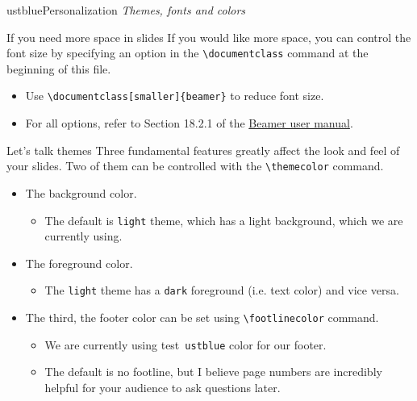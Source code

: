 \documentclass[]{beamer}
\newcommand{\hrefcol}[2]{\textcolor{uihteal}{\href{#1}{#2}}}
\newcommand{\testcolor}[1]{\colorbox{#1}{\textcolor{#1}{test}}~\texttt{#1}}
\begin{document}

\begin{chapter}{ustblue}{Personalization}
\textit{Themes, fonts and colors}
\end{chapter}


\begin{frame}[fragile]{If you need more space in slides}
If you would like more space, you can control the font size by specifying an option in the \verb|\documentclass| command at the beginning of this file.
\begin{itemize}
    \item Use \verb|\documentclass[smaller]{beamer}| to reduce font size.
    \item For all options, refer to Section 18.2.1 of the \hrefcol{https://www.ctan.org/tex-archive/macros/latex/contrib/beamer/doc/beameruserguide.pdf}{Beamer user manual}.
\end{itemize}
\end{frame}


\begin{frame}[fragile]{Let's talk themes}
Three fundamental features greatly affect the look and feel of your slides. Two of them can be controlled with the \verb|\themecolor| command.
\begin{itemize}
\item The background color.
\begin{itemize}
    \item The default is \verb|light| theme, which has a light background, which we are currently using.
\end{itemize}
\item The foreground color.
\begin{itemize}
    \item The \verb|light| theme has a \verb|dark| foreground (i.e. text color) and vice versa.
\end{itemize}
\item The third, the footer color can be set using \verb|\footlinecolor| command.
\begin{itemize}
    \item We are currently using \testcolor{ustblue} color for our footer.
    \item The default is no footline, but I believe page numbers are incredibly helpful for your audience to ask questions later.
\end{itemize}
\end{itemize}
\end{frame}
\end{document}

